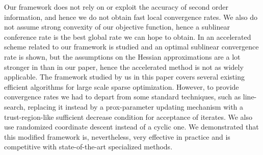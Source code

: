 \documentclass[11pt]{article}
\numberwithin{equation}{section}
\begin{document}
Our framework does not rely on or exploit the accuracy of second order information, and hence we do not obtain fast local convergence rates. We also do not assume strong convexity of our objective function, hence a sublinear conference rate is  the best global rate we can hope to obtain. In \cite{Jiangetal2012} an accelerated scheme related to our framework is studied and an optimal sublinear convergence rate is shown, but  the assumptions on the Hessian approximations are a lot stronger in  \cite{Jiangetal2012} than in our paper, hence the accelerated method is not as widely applicable. The framework studied by us in this paper covers several existing efficient algorithms for large scale sparse optimization. However, to provide convergence rates we had to depart from some standard techniques, such as line-search, replacing it instead by a prox-parameter updating mechanism with a trust-region-like sufficient decrease condition for acceptance of iterates. We also use randomized coordinate descent instead of a cyclic one. We demonstrated  that this modified framework is,  nevertheless, very effective in practice and is competitive with state-of-the-art specialized methods.


% 

\end{document}
